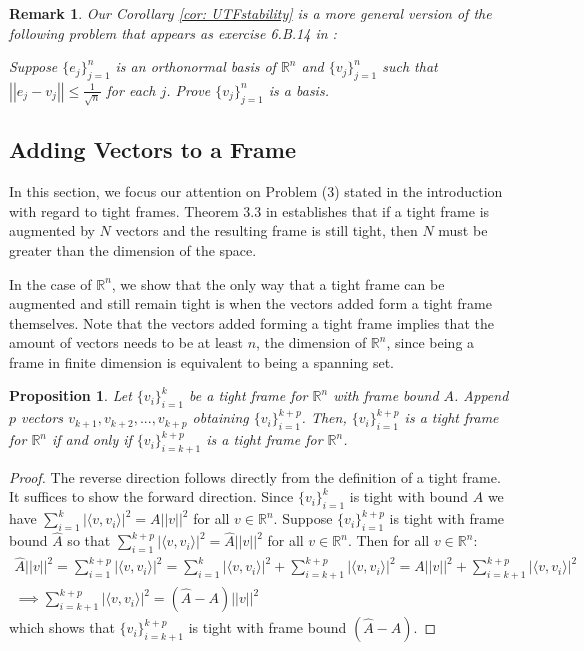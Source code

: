 \documentclass[11pt, reqno]{amsart}
\providecommand{\R}{\mathbb R}
\newcommand{\norm}[1]{\left|\left| #1 \right|\right|}
\newtheorem{prop}[theorem]{Proposition}
\newtheorem*{remark}{Remark}
\numberwithin{equation}{section}
\begin{document}
\begin{remark}
Our Corollary \ref{cor: UTFstability} is a more general version of the following problem that appears as exercise 6.B.14 in \cite{Axler}:
\begin{center}
   Suppose $\{e_j\}_{j=1}^n$ is an orthonormal basis of $\R^n$ and $\{v_j\}_{j=1}^n$ such that $\norm{e_j-v_j}\le \frac{1}{\sqrt{n}}$ for each $j$. Prove $\{v_j\}_{j=1}^n$ is a basis.
\end{center}
\end{remark}
 
\subsection{Adding Vectors to a Frame}
In this section, we focus our attention on Problem (3) stated in the introduction with regard to tight frames. Theorem 3.3 in \cite{LS2009} establishes that if a tight frame is augmented by $N$ vectors and the resulting frame is still tight, then $N$ must be greater than the dimension of the space.

In the case of $\R^n$, we show that the only way that a tight frame can be augmented and still remain tight is when the vectors added form a tight frame themselves. Note that the vectors added forming a tight frame implies that the amount of vectors needs to be at least $n$, the dimension of $\R^n$, since being a frame in finite dimension is equivalent to being a spanning set.

\begin{prop}
	\label{TightFramesProp}
	Let $\{v_i\}_{i=1}^k$ be a tight frame for $\R^n$ with frame bound $A$. Append $p$ vectors $v_{k+1},v_{k+2},...,v_{k+p}$ obtaining $\{v_i\}_{i=1}^{k+p}$. Then, $\{v_i\}_{i=1}^{k+p}$ is a tight frame for $\R^n$ if and only if  $\{v_i\}_{i=k+1}^{k+p}$ is a tight frame for $\R^n$.
\end{prop}

\begin{proof}
The reverse direction follows directly from the definition of a tight frame. It suffices to show the forward direction. Since $\{v_i\}_{i=1}^k$ is tight with bound $A$ we have $\sum_{i=1}^{k} |\langle v,v_i \rangle|^2 = A||v||^2$ for all $v \in \R^n$. Suppose $\{v_i\}_{i=1}^{k+p}$ is tight with frame bound $\hat{A}$ so that $\sum_{i=1}^{k+p} |\langle v,v_i \rangle|^2 = \hat{A}||v||^2$ for all $v \in \R^n$. Then for all $v \in \R^n$: 
\begin{gather*}
\hat{A}||v||^2 = \sum_{i=1}^{k+p} |\langle v,v_i \rangle|^2 = \sum_{i=1}^{k} |\langle v,v_i \rangle|^2 + \sum_{i=k+1}^{k+p} |\langle v,v_i \rangle|^2 = A||v||^2 + \sum_{i=k+1}^{k+p} |\langle v,v_i \rangle|^2 \\
\implies \sum_{i=k+1}^{k+p} |\langle v,v_i \rangle|^2 = \left( \hat{A}-A \right)||v||^2
\end{gather*}
which shows that $\{v_i\}_{i=k+1}^{k+p}$ is tight with frame bound $(\hat{A}-A)$.

\end{proof}
\end{document}
